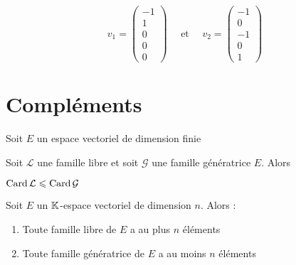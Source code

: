 \begin{frame}
\begin{exemple}
\pause
$$ v_1 = \left( \begin{smallmatrix} -1\\1\\0\\0\\0\end{smallmatrix}\right) 
\quad \text{ et } \quad 
v_2 =  \left( \begin{smallmatrix} -1\\0\\-1\\0\\1\end{smallmatrix}\right)$$ 
\end{exemple}
\end{frame}




\section{Compléments}

\begin{frame}
Soit $E$ un espace vectoriel de dimension finie
\begin{lemme}
Soit $\mathcal{L}$ une famille libre et soit
$\mathcal{G}$ une famille génératrice $E$. Alors \\
\centerline{$\mathop{\text{Card}}\nolimits \mathcal{L} \leqslant \mathop{\text{Card}}\nolimits \mathcal{G}$}
\end{lemme}

\bigskip
\pause

\begin{proposition}
Soit $E$ un $\mathbb{K}$-espace vectoriel de dimension $n$. Alors :
\pause
\begin{enumerate}
  \item Toute famille libre de $E$ a au plus $n$ éléments
\pause  
  \item Toute famille génératrice de $E$ a au moins $n$ éléments
\end{enumerate}
\end{proposition}
\end{frame}

